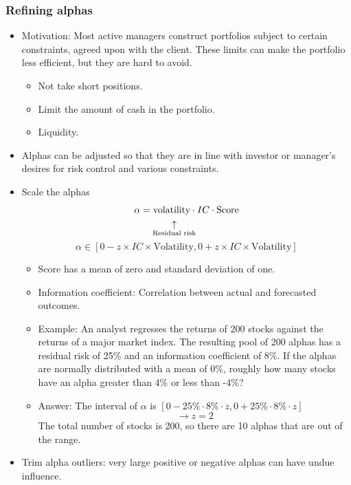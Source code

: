 \subsubsection{Refining alphas}
\begin{itemize}
\item Motivation: Most active managers construct portfolios subject to certain constraints, agreed upon with the client. These limits can make the portfolio less efficient, but they are hard to avoid.
    \begin{itemize}
    \item Not take short positions.
    \item Limit the amount of cash in the portfolio.
    \item Liquidity.
    \end{itemize}
\item Alphas can be adjusted so that they are in line with investor or manager's desires for risk control and various constraints.
\item Scale the alphas
\begin{align}
    \alpha &= \text{volatility} \cdot IC \cdot \text{Score} \notag \\
    &\quad \underset{\text{Residual risk}}{\uparrow}
    \end{align}
\[
\alpha \in [0 - z \times IC \times \text{Volatility}, 0 + z \times IC \times \text{Volatility}]
\]
    \begin{itemize}
    \item Score has a mean of zero and standard deviation of one.
    \item Information coefficient: Correlation between actual and forecasted outcomes.
    \item Example: An analyst regresses the returns of 200 stocks against the returns of a major market index. The resulting pool of 200 alphas has a residual risk of 25\% and an information coefficient of 8\%. If the alphas are normally distributed with a mean of 0\%, roughly how many stocks have an alpha greater than 4\% or less than -4\%?
    \item Answer:
    The interval of $\alpha$ is $[0 - 25\% \cdot 8\% \cdot z, 0 + 25\% \cdot 8\% \cdot z]$
\[
\rightarrow z = 2
\]
The total number of stocks is 200, so there are 10 alphas that are out of the range.
    \end{itemize}
\item Trim alpha outliers: very large positive or negative alphas can have undue influence.
    \begin{itemize}

\end{itemize}
\end{itemize}
